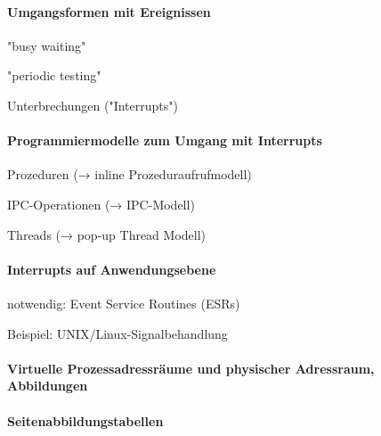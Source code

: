 \documentclass[a4pape]{article}
\begin{document}
\begin{multicols}{3}
  \paragraph{Umgangsformen mit Ereignissen}
  \begin{itemize*}
    \item "busy waiting"
    \item "periodic testing"
    \item Unterbrechungen ("Interrupts")
  \end{itemize*}

  \paragraph{Programmiermodelle zum Umgang mit Interrupts}
  \begin{itemize*}
    \item Prozeduren (→ inline Prozeduraufrufmodell)
    \item IPC-Operationen (→ IPC-Modell)
    \item Threads (→ pop-up Thread Modell)
  \end{itemize*}

  \paragraph{Interrupts auf Anwendungsebene}
  \begin{itemize*}
    \item notwendig: Event Service Routines (ESRs)
    \item Beispiel: UNIX/Linux-Signalbehandlung
  \end{itemize*}

  \paragraph{Virtuelle Prozessadressräume und physischer Adressraum, Abbildungen}

  \paragraph{Seitenabbildungstabellen}


\end{multicols}
\end{document}
